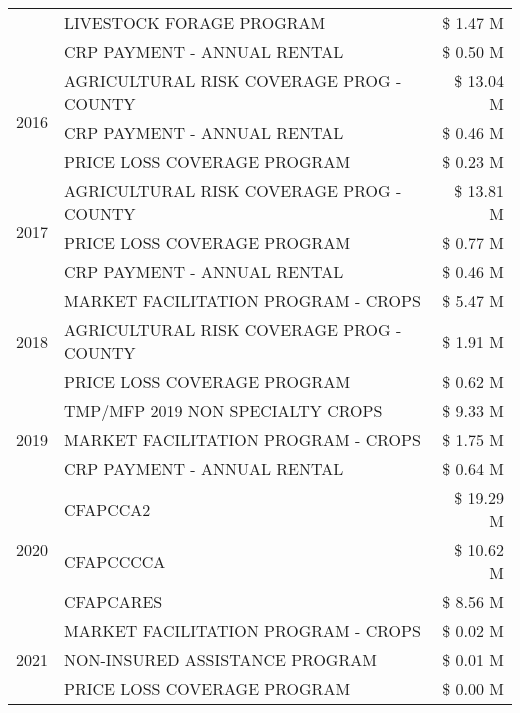 \begin{tabular}{llr}
 & LIVESTOCK FORAGE PROGRAM & \$ 1.47 M \\
 & CRP PAYMENT - ANNUAL RENTAL & \$ 0.50 M \\
\cline{1-3}
\multirow[t]{3}{*}{2016} & AGRICULTURAL RISK COVERAGE PROG - COUNTY & \$ 13.04 M \\
 & CRP PAYMENT - ANNUAL RENTAL & \$ 0.46 M \\
 & PRICE LOSS COVERAGE PROGRAM & \$ 0.23 M \\
\cline{1-3}
\multirow[t]{3}{*}{2017} & AGRICULTURAL RISK COVERAGE PROG - COUNTY & \$ 13.81 M \\
 & PRICE LOSS COVERAGE PROGRAM & \$ 0.77 M \\
 & CRP PAYMENT - ANNUAL RENTAL & \$ 0.46 M \\
\cline{1-3}
\multirow[t]{3}{*}{2018} & MARKET FACILITATION PROGRAM - CROPS & \$ 5.47 M \\
 & AGRICULTURAL RISK COVERAGE PROG - COUNTY & \$ 1.91 M \\
 & PRICE LOSS COVERAGE PROGRAM & \$ 0.62 M \\
\cline{1-3}
\multirow[t]{3}{*}{2019} & TMP/MFP 2019 NON SPECIALTY CROPS & \$ 9.33 M \\
 & MARKET FACILITATION PROGRAM - CROPS & \$ 1.75 M \\
 & CRP PAYMENT - ANNUAL RENTAL & \$ 0.64 M \\
\cline{1-3}
\multirow[t]{3}{*}{2020} & CFAPCCA2 & \$ 19.29 M \\
 & CFAPCCCCA & \$ 10.62 M \\
 & CFAPCARES & \$ 8.56 M \\
\cline{1-3}
\multirow[t]{3}{*}{2021} & MARKET FACILITATION PROGRAM - CROPS & \$ 0.02 M \\
 & NON-INSURED ASSISTANCE PROGRAM & \$ 0.01 M \\
 & PRICE LOSS COVERAGE PROGRAM & \$ 0.00 M \\
\cline{1-3}
\bottomrule
\end{tabular}
